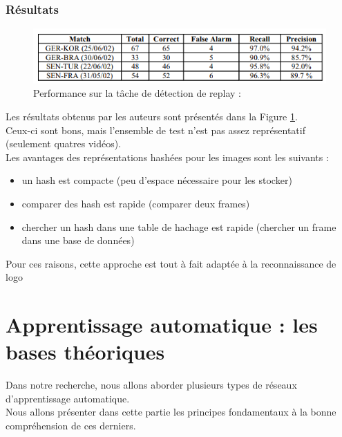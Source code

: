 \documentclass[11pt]{article}
\begin{document}
\subsubsection{Résultats}
\label{sec:org85b7506}
\begin{figure}[htbp]
\centering
\includegraphics[width=.9\linewidth]{mean_shift_res.png}
\caption{Performance sur la tâche de détection de replay :\label{mean-shift-res}}
\end{figure}
Les résultats obtenus par les auteurs sont présentés dans la Figure \ref{mean-shift-res}.\\
Ceux-ci sont bons, mais l'ensemble de test n'est pas assez représentatif (seulement quatres vidéos).\\
Les avantages des représentations hashées pour les images sont les suivants :\\
\begin{itemize}
\item un hash est compacte (peu d'espace nécessaire pour les stocker)\\
\item comparer des hash est rapide (comparer deux frames)\\
\item chercher un hash dans une table de hachage est rapide (chercher un frame dans une base de données)\\
\end{itemize}
Pour ces raisons, cette approche est tout à fait adaptée à la reconnaissance de logo\\

\newpage
\section{Apprentissage automatique : les bases théoriques}
\label{sec:org0e06ccd}
Dans notre recherche, nous allons aborder plusieurs types de réseaux d'apprentissage automatique.\\
Nous allons présenter dans cette partie les principes fondamentaux à la bonne compréhension de ces derniers.\\
\end{document}
